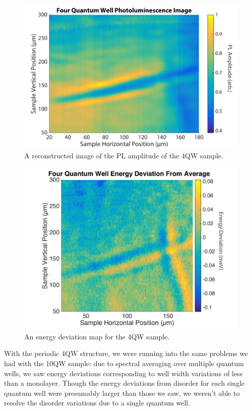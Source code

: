 \begin{figure}[h!]
\centering
\includegraphics[width = .7\textwidth]{4QW_Img.png}
\caption{ \doublespacing A reconstructed image of the PL amplitude of the 4QW sample.}
\label{4qwimg}
\end{figure}
\begin{figure}[h!]
\centering
\includegraphics[width = .8\textwidth]{4QW_devplot.png}
\caption{ \doublespacing An energy deviation map for the 4QW sample.}
\label{4qwdev}
\end{figure}


\indent With the periodic 4QW structure, we were running into the same problems we had with the 10QW sample: due to spectral averaging over multiple quantum wells, we saw energy deviations corresponding to well width variations of less than a monolayer. Though the energy deviations from disorder for each single quantum well were presumably larger than those we saw, we weren't able to resolve the disorder variations due to a single quantum well. 

